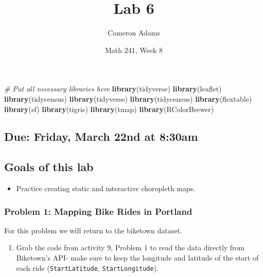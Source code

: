 \documentclass[
]{article}
\title{Lab 6}
\author{Cameron Adams}
\date{Math 241, Week 8}
\newenvironment{Shaded}{\begin{snugshade}}{\end{snugshade}}
\newcommand{\CommentTok}[1]{\textcolor[rgb]{0.56,0.35,0.01}{\textit{#1}}}
\newcommand{\FunctionTok}[1]{\textcolor[rgb]{0.13,0.29,0.53}{\textbf{#1}}}
\newcommand{\NormalTok}[1]{#1}
\providecommand{\tightlist}{%
  \setlength{\itemsep}{0pt}\setlength{\parskip}{0pt}}
\begin{document}
\maketitle

\begin{Shaded}
\begin{Highlighting}[]
\CommentTok{\# Put all necessary libraries here}
\FunctionTok{library}\NormalTok{(tidyverse)}
\FunctionTok{library}\NormalTok{(leaflet)}
\FunctionTok{library}\NormalTok{(tidycensus)}
\FunctionTok{library}\NormalTok{(tidyverse)}
\FunctionTok{library}\NormalTok{(tidycensus)}
\FunctionTok{library}\NormalTok{(flextable)}
\FunctionTok{library}\NormalTok{(sf)}
\FunctionTok{library}\NormalTok{(tigris)}
\FunctionTok{library}\NormalTok{(tmap)}
\FunctionTok{library}\NormalTok{(RColorBrewer)}
\end{Highlighting}
\end{Shaded}

\hypertarget{due-friday-march-22nd-at-830am}{%
\subsection{Due: Friday, March 22nd at
8:30am}\label{due-friday-march-22nd-at-830am}}

\hypertarget{goals-of-this-lab}{%
\subsection{Goals of this lab}\label{goals-of-this-lab}}

\begin{itemize}
\tightlist
\item
  Practice creating static and interactive choropleth maps.
\end{itemize}

\hypertarget{problem-1-mapping-bike-rides-in-portland}{%
\subsubsection{Problem 1: Mapping Bike Rides in
Portland}\label{problem-1-mapping-bike-rides-in-portland}}

For this problem we will return to the biketown dataset.

\begin{enumerate}
\def\labelenumi{\alph{enumi}.}
\tightlist
\item
  Grab the code from activity 9, Problem 1 to read the data directly
  from Biketown's API- make sure to keep the longitude and latitude of
  the start of each ride (\texttt{StartLatitude},
  \texttt{StartLongitude}).
\end{enumerate}
\end{document}
